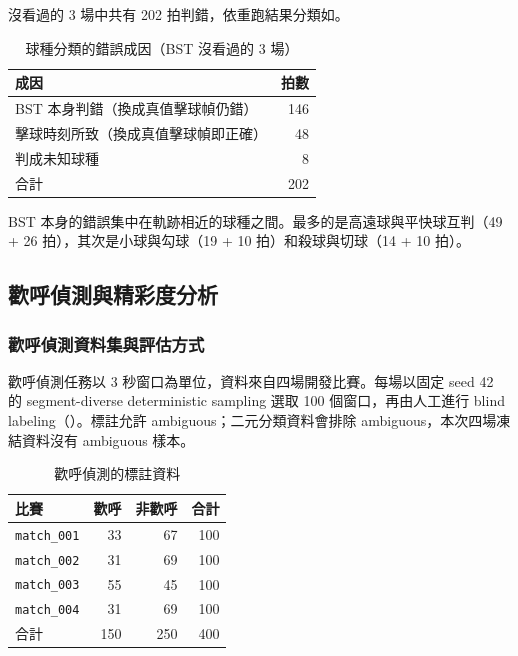 沒看過的 3 場中共有 202 拍判錯，依重跑結果分類如。

\begin{table}[htbp]
  \centering
  \small
  \caption{球種分類的錯誤成因（BST 沒看過的 3 場）}
  \label{tab:stroke-failures}
  \begin{tabular}{|l|r|}
    \hline
    成因 & 拍數 \\ \hline
    BST 本身判錯（換成真值擊球幀仍錯） & 146 \\ \hline
    擊球時刻所致（換成真值擊球幀即正確） & 48 \\ \hline
    判成未知球種 & 8 \\ \hline
    合計 & 202 \\ \hline
  \end{tabular}
\end{table}

BST 本身的錯誤集中在軌跡相近的球種之間。最多的是高遠球與平快球互判（49 + 26 拍），其次是小球與勾球（19 + 10 拍）和殺球與切球（14 + 10 拍）。

\subsection{歡呼偵測與精彩度分析}
\label{sec:exp-cheer}

\subsubsection{歡呼偵測資料集與評估方式}

歡呼偵測任務以 3 秒窗口為單位，資料來自四場開發比賽。每場以固定 seed 42 的 segment-diverse deterministic sampling 選取 100 個窗口，再由人工進行 blind labeling（）。標註允許 ambiguous；二元分類資料會排除 ambiguous，本次四場凍結資料沒有 ambiguous 樣本。

\begin{table}[htbp]
  \centering
  \small
  \caption{歡呼偵測的標註資料}
  \label{tab:cheer-dataset}
  \begin{tabular}{|l|r|r|r|}
    \hline
    比賽 & 歡呼 & 非歡呼 & 合計 \\ \hline
    \texttt{match\_001} & 33 & 67 & 100 \\ \hline
    \texttt{match\_002} & 31 & 69 & 100 \\ \hline
    \texttt{match\_003} & 55 & 45 & 100 \\ \hline
    \texttt{match\_004} & 31 & 69 & 100 \\ \hline
    合計 & 150 & 250 & 400 \\ \hline
  \end{tabular}
\end{table}

